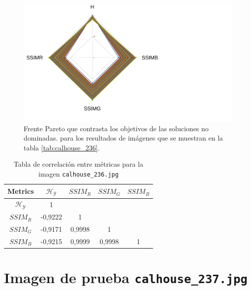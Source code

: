     \begin{figure}[H]
    \centering
    \includegraphics[width=\textwidth]{./Figures/calhouse_236/calhouse_236_2.jpg}
    \caption{Frente Pareto que contrasta los objetivos de las soluciones no dominadas. para los resultados de imágenes que se muestran en la tabla \ref{tab:calhouse_236}.}
    \label{fig:calhouse2362fp}
    \end{figure}

\begin{table}[H]
\setlength{\abovecaptionskip}{2pt plus 3pt minus 2pt} %
\caption[Parámetros de entrada para $MOPSO$]{Tabla de correlación entre métricas para la imagen \texttt{calhouse\_236.jpg}}
\begin{center}
 \begin{tabular}{||c | c c c c||} 
 \hline
Metrics & $\mathscr{H_Y}$ & $SSIM_R$ & $SSIM_G$ & $SSIM_B$ \\ 
\hline
$\mathscr{H_Y}$ & 1 &  &  & \\ 
\hline
$SSIM_R$ & -0,9222 & 1 &  \\ 
\hline
$SSIM_G$ & -0,9171 & 0,9998  & 1  & \\ 
\hline
$SSIM_B$ & -0,9215 & 0,9999  & 0,9998  & 1 \\ 
\hline
\end{tabular}
\end{center}
\label{table:correlacion}
\end{table}



\section{Imagen de prueba \texttt{calhouse\_237.jpg}}

